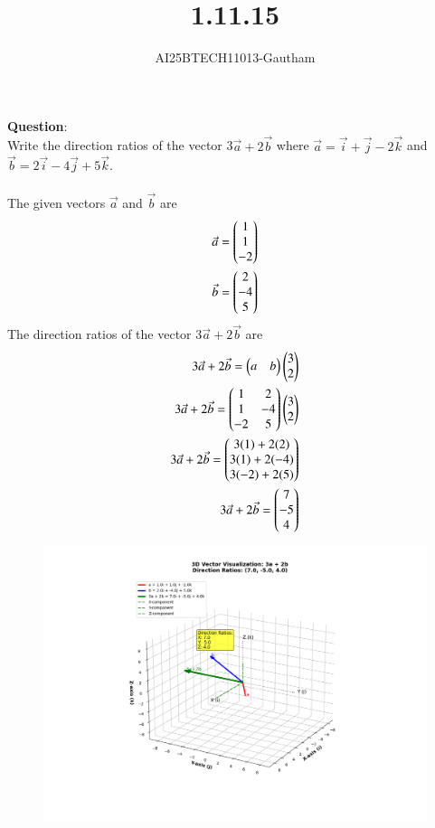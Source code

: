 \documentclass[journal]{IEEEtran}
\begin{document}

\vspace{3cm}

\title{1.11.15}
\author{AI25BTECH11013-Gautham}
 \maketitle
{\let\newpage\relax\maketitle}

\renewcommand{\thefigure}{\theenumi}
\renewcommand{\thetable}{\theenumi}
\setlength{\intextsep}{10pt} %


\renewcommand{\thetable}{\theenumi}                          
\textbf{Question}:\\
Write the direction ratios of the vector 3$\Vec{a}+2\Vec{b}$ where $\Vec{a}=\overrightarrow{i}+\overrightarrow{j}-2\overrightarrow{k}$ and $\Vec{b}=2\overrightarrow{i}-4\overrightarrow{j}+5\overrightarrow{k}$.\\
\solution \\
The given vectors $\Vec{a}$ and $\Vec{b}$ are 
\begin{align}
\Vec{a}=\begin{pmatrix}1 \\ 1 \\ -2\end{pmatrix} \\
\Vec{b}=\begin{pmatrix}2 \\ -4 \\ 5\end{pmatrix}
\end{align}
The direction ratios of the vector $3\Vec{a}+2\Vec{b}$ are
\begin{align}
  3\Vec{a}+2\Vec{b}=\begin{pmatrix}a&b\end{pmatrix}\begin{pmatrix}3 \\ 2\end{pmatrix}\\
  3\Vec{a}+2\Vec{b}=\begin{pmatrix}1 & 2 \\ 1 &-4 \\ -2 & 5\end{pmatrix}\begin{pmatrix}3\\2\end{pmatrix}\\
  3\Vec{a}+2\Vec{b}=\begin{pmatrix}3(1)+2(2)\\3(1)+2(-4)\\3(-2)+2(5)\end{pmatrix}\\
  3\Vec{a}+2\Vec{b}=\begin{pmatrix}7\\-5\\4\end{pmatrix}
\end{align}
\begin{figure}[ht]
    \centering
    \includegraphics[height=0.6\textheight, keepaspectratio]{figs/fig1.png}
    \label{figure_1}
\end{figure}
\end{document}
